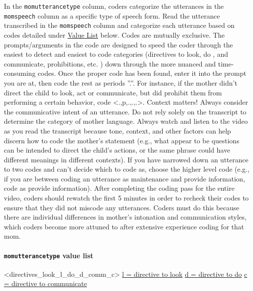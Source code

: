 \documentclass[
  12pt,
]{book}
\begin{document}
In the \texttt{momutterancetype} column, coders categorize the utterances in the \texttt{momspeech} column as a specific type of speech form. Read the utterance transcribed in the \texttt{momspeech} column and categorize each utterance based on codes detailed under \protect\hyperlink{momutterancetype_value_list}{Value List} below.
Codes are mutually exclusive. The prompts/arguments in the code are designed to speed the coder through the easiest to detect and easiest to code categories (directives to look, do , and communicate, prohibitions, etc. ) down through the more nuanced and time-consuming codes. Once the proper code has been found, enter it into the prompt you are at, then code the rest as periods ''.''. For instance, if the mother didn't direct the child to look, act or communicate, but did prohibit them from performing a certain behavior, code \textless.,p,.,.,.\textgreater.
Context matters! Always consider the communicative intent of an utterance.
Do not rely solely on the transcript to determine the category of mother language. Always watch and listen to the video as you read the transcript because tone, context, and other factors can help discern how to code the mother's statement (e.g., what appear to be questions can be intended to direct the child's actions, or the same phrase could have different meanings in different contexts). If you have narrowed down an utterance to two codes and can't decide which to code as, choose the higher level code (e.g., if you are between coding an utterance as maintenance and provide information, code as provide information).
After completing the coding pass for the entire video, coders should rewatch the first 5 minutes in order to recheck their codes to ensure that they did not miscode any utterances. Coders must do this because there are individual differences in mother's intonation and communication styles, which coders become more attuned to after extensive experience coding for that mom.

\hypertarget{momutterancetype_value_list}{%
\paragraph*{\texorpdfstring{\texttt{momutterancetype} value list}{momutterancetype value list}}\label{momutterancetype_value_list}}

\textless directives\_look\_l\_do\_d\_comm\_c\textgreater{}
\protect\hyperlink{directive_to_look}{l = directive to look}
\protect\hyperlink{directive_to_do}{d = directive to do}
\protect\hyperlink{directive_to_communicate}{c = directive to communicate}
\end{document}
